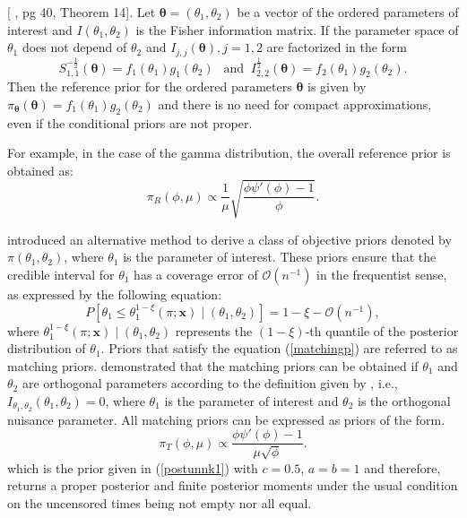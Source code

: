 \begin{proposition}\label{propositionop} [ \cite{bernardo2005}, pg 40, Theorem 14]. Let $\boldsymbol\theta=(\theta_1,\theta_2)$ be a vector of the ordered parameters of interest and $I(\theta_1,\theta_2)$ is the Fisher information matrix. If the parameter space  of $\theta_1$ does not depend of $\theta_2$ and $I_{j,j}(\boldsymbol\theta), j=1,2$ are factorized in the form 
\begin{equation*}
S_{1,1}^{-\frac{1}{2}}(\boldsymbol\theta)=f_1(\theta_1)g_1(\theta_2) \ \ \mbox{ and } \ I_{2,2}^{\frac{1}{2}}(\boldsymbol\theta)=f_2(\theta_1)g_2(\theta_2) . 
\end{equation*}
Then the reference prior for the ordered parameters $\boldsymbol\theta$ is given by $\pi_{\boldsymbol\theta}(\boldsymbol\theta)=f_1(\theta_1)g_2(\theta_2)$ and there is no need for compact approximations, even if the conditional priors are not proper.
\end{proposition} 

For example, in the case of the gamma distribution, the overall reference prior is obtained as:
\begin{equation*}%
\pi_R\left(\phi,\mu\right)\propto \frac{1}{\mu}\sqrt{\frac{\phi\psi'(\phi)-1}{\phi}}.
\end{equation*}

\cite{tibshirani1989noninformative} introduced an alternative method to derive a class of objective priors denoted by $\pi\left(\theta_1, \theta_2\right)$, where $\theta_1$ is the parameter of interest. These priors ensure that the credible interval for $\theta_1$ has a coverage error of $\mathcal{O}\left(n^{-1}\right)$ in the frequentist sense, as expressed by the following equation:
\begin{equation}\label{matchingp}
P\left[\theta_1\leq\theta_1^{1-\xi}\left(\pi;\boldsymbol{x}\right) \mid \left(\theta_1,\theta_2\right)\right] =
1-\xi-\mathcal{O}\left(n^{-1}\right),
\end{equation}
where $\theta_1^{1-\xi}\left(\pi;\boldsymbol{x}\right) \mid \left(\theta_1,\theta_2\right)$ represents the $(1-\xi)$-th quantile of the posterior distribution of $\theta_1$. Priors that satisfy the equation (\ref{matchingp}) are referred to as matching priors.  \cite{tibshirani1989noninformative} demonstrated that the matching priors can be obtained if $\theta_1$ and $\theta_2$ are orthogonal parameters according to the definition given by \cite{cox1987parameter}, i.e., $I_{\theta_1, \theta_2}\left(\theta_1, \theta_2\right)=0$, where $\theta_1$ is the parameter of interest and $\theta_2$ is the orthogonal nuisance parameter. All matching priors can be expressed as priors of the form.
\begin{equation*}%
\pi_{T}\left(\phi,\mu\right)\propto \frac{\phi\psi'(\phi)-1}{\mu\sqrt{\phi}}.
\end{equation*}
which is the prior given in (\ref{postunnk1}) with $c=0.5$, $a=b=1$ and therefore, returns a proper posterior and finite posterior moments under the usual condition on the uncensored times being not empty nor all equal.


